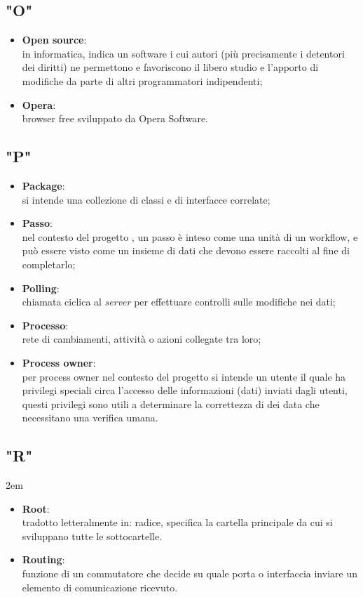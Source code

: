 \subsection*{"O"}
\begin{itemize}
\itemsep2em
\item \textbf{Open source}:\\ in informatica, indica un software i cui autori (più precisamente i detentori dei diritti) ne permettono e favoriscono il libero studio e l'apporto di modifiche da parte di altri programmatori indipendenti;
\item \textbf{Opera}:\\ browser free sviluppato da Opera Software.
\end{itemize}

\subsection*{"P"}
\begin{itemize}
\itemsep2em
\item \textbf{Package}:\\ si intende una collezione di classi e di interfacce correlate;
\item \textbf{Passo}:\\ nel contesto del progetto \progetto{}, un passo è inteso come una unità di un workflow, e può essere visto come un insieme di dati che devono essere raccolti al fine di completarlo;
\item \textbf{Polling}:\\
chiamata ciclica al \textit{server} per effettuare controlli sulle modifiche nei dati;
\item \textbf{Processo}:\\ rete di cambiamenti, attività o azioni collegate tra loro;
\item \textbf{Process owner}:\\ per process owner nel contesto del progetto si intende un utente il quale ha privilegi speciali circa l'accesso delle informazioni (dati) inviati dagli utenti, questi privilegi sono utili a determinare la correttezza di dei data che necessitano una verifica umana.
\end{itemize}
\subsection*{"R"}
\itemsep2em
\begin{itemize}
\item \textbf{Root}:\\ tradotto letteralmente in: radice, specifica la cartella principale da cui si sviluppano tutte le sottocartelle.
\item \textbf{Routing}:\\ funzione di un commutatore che decide su quale porta o interfaccia inviare un elemento di comunicazione ricevuto.
\end{itemize}
